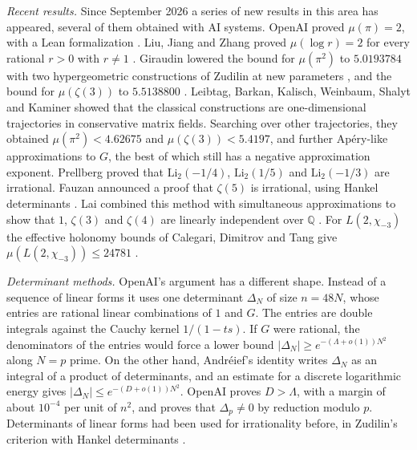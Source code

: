 \documentclass[11pt]{amsart}
\theoremstyle{definition}
\theoremstyle{remark}
\numberwithin{equation}{section}
\newcommand{\Q}{\mathbb Q}
\begin{document}
\emph{Recent results.} Since September 2026 a series of new results in this area has appeared, several of
them obtained with AI systems. OpenAI proved $\mu(\pi)=2$, with a Lean formalization \cite{OpenAIPi2026}.
Liu, Jiang and Zhang proved $\mu(\log r)=2$ for every rational $r>0$ with $r\ne1$ \cite{LiuJiangZhang26}.
Giraudin lowered the bound for $\mu(\pi^2)$ to $5.0193784$ with two hypergeometric constructions of Zudilin
\cite{Zudilin14} at new parameters \cite{Giraudin26}, and the bound for $\mu(\zeta(3))$ to $5.5138800$
\cite{Giraudin26z3}. Leibtag, Barkan, Kalisch, Weinbaum, Shalyt and Kaminer \cite{LBKWSK26} showed that the
classical constructions are one-dimensional trajectories in conservative matrix fields. Searching over other
trajectories, they obtained $\mu(\pi^2)<4.62675$ and $\mu(\zeta(3))<5.4197$, and further Ap\'ery-like
approximations to $G$, the best of which still has a negative approximation exponent. Prellberg
\cite{Prellberg26} proved that $\mathrm{Li}_2(-1/4)$, $\mathrm{Li}_2(1/5)$ and $\mathrm{Li}_2(-1/3)$ are
irrational. Fauzan announced a proof that $\zeta(5)$ is irrational, using Hankel determinants
\cite{Fauzan2026}. Lai combined this method with simultaneous approximations to show that $1$, $\zeta(3)$ and
$\zeta(4)$ are linearly independent over $\Q$ \cite{Lai2026}. For $L(2,\chi_{-3})$ the effective holonomy
bounds of Calegari, Dimitrov and Tang give $\mu(L(2,\chi_{-3}))\le24781$ \cite[Thm.~5.1]{CDT2025}.

\emph{Determinant methods.} OpenAI's argument \cite{OpenAI2026} has a different shape. Instead of a
sequence of linear forms it uses one determinant $\Delta_N$ of size $n=48N$, whose entries are rational
linear combinations of $1$ and $G$. The entries are double integrals against the Cauchy kernel
$1/(1-ts)$. If $G$ were rational, the denominators of the entries would force a lower bound
$|\Delta_N|\ge e^{-(\Lambda+o(1))N^2}$ along $N=p$ prime. On the other hand, Andr\'eief's identity
\cite{Forrester2018Andreief} writes $\Delta_N$ as an integral of a product of determinants, and an estimate
for a discrete logarithmic energy gives $|\Delta_N|\le e^{-(D+o(1))N^2}$. OpenAI proves $D>\Lambda$, with a
margin of about $10^{-4}$ per unit of $n^2$, and proves that $\Delta_p\ne0$ by reduction modulo $p$.
Determinants of linear forms had been used for irrationality before, in Zudilin's criterion with Hankel
determinants \cite{Zudilin}.
\end{document}
